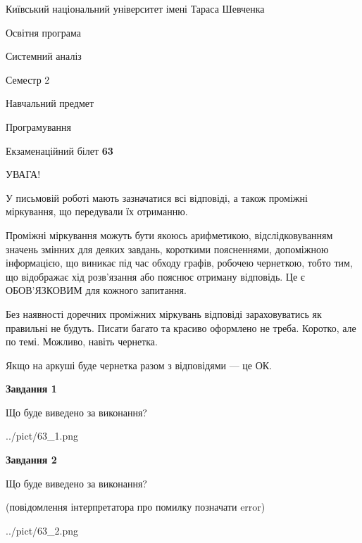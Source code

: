 \documentclass[12pt, ukrainian]{article}
\begin{document}
{{\begin {small}\par
{ \center  Київський національний університет імені Тараса Шевченка \par}
{\parbox {5 cm}{Освітня програма \hfill}{\parbox {7 cm}{Системний аналіз \hfill}}\parbox {6 cm}{\hfill Семестр 2}}\par
{\parbox {5 cm} {Навчальний предмет \hfill}\parbox {7 cm}{Програмування \hfill}\parbox {6cm}{\hfill}\par}\vspace{-7pt} \end{small}}{\center Екзаменаційний білет \No \textbf
{ 63 }\par}}
{
\begin {large}
УВАГА!

У письмовій роботі мають зазначатися всі відповіді, а також проміжні міркування, що передували їх отриманню.

Проміжні міркування можуть бути якоюсь арифметикою, відслідковуванням зна\-чень змінних для деяких завдань,
короткими поясненнями, допоміжною інформацією, що виникає під час обходу графів, робочею чернеткою,
тобто тим, що відображає хід розв’язання або пояснює отриману відповідь.
Це є ОБОВ’ЯЗКОВИМ для кожного запитання.

Без наявності доречних проміжних міркувань відповіді зараховуватись як правиль\-ні не будуть.
Писати багато та красиво оформлено не треба. Коротко, але по темі. Можли\-во, навіть чернетка.

Якщо на аркуші буде чернетка разом з відповідями --- це ОК.

\newpage

{\begin {center}\textbf{Завдання 1}\end {center}}\par
Що буде виведено за виконання?\par
\begin{center}
	{../pict/63_1.png}
\end{center}
\newpage

{\begin {center}\textbf{Завдання 2}\end {center}}\par
Що буде виведено за виконання?\par
 (повідомлення інтерпретатора про помилку позначати error)\par
\begin{center}
	{../pict/63_2.png}
\end{center}
\newpage


\end{large}}
\end{document}
